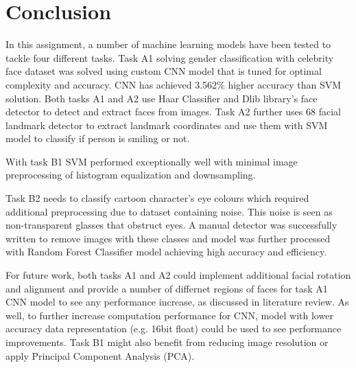 \documentclass{article}
\begin{document}
\section{Conclusion}
\label{sec:conc}

In this assignment, a number of machine learning models have been tested to tackle four different tasks. Task A1 solving gender classification with celebrity face dataset was solved using custom CNN model that is tuned for optimal complexity and accuracy. CNN has achieved 3.562\% higher accuracy than SVM solution. Both tasks A1 and A2 use Haar Classifier and Dlib library's face detector to detect and extract faces from images. Task A2 further uses 68 facial landmark detector to extract landmark coordinates and use them with SVM model to classify if person is smiling or not. 

With task B1 SVM performed exceptionally well with minimal image preprocessing of histogram equalization and downsampling. 

Task B2 needs to classify cartoon character's eye colours which required additional preprocessing due to dataset containing noise. This noise is seen as non-transparent glasses that obstruct eyes. A manual detector was successfully written to remove images with these classes and model was further processed with Random Forest Classifier model achieving high accuracy and efficiency. 

For future work, both tasks A1 and A2 could implement additional facial rotation and alignment and provide a number of differnet regions of faces for task A1 CNN model to see any performance increase, as discussed in literature review. As well, to further increase computation performance for CNN, model with lower accuracy data representation (e.g. 16bit float) could be used to see performance improvements. Task B1 might also benefit from reducing image resolution or apply Principal Component Analysis (PCA).

\vfill\pagebreak



\end{document}
